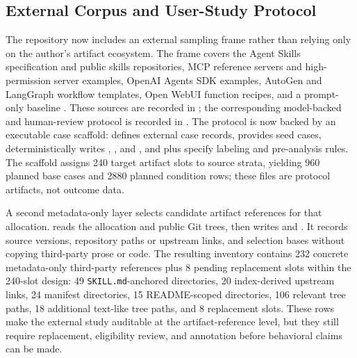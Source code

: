 \documentclass[11pt]{article}
\begin{document}
\subsection{External Corpus and User-Study Protocol}

The repository now includes an external sampling frame rather than relying
only on the author's artifact ecosystem. The frame covers the Agent Skills
specification and public skills repositories, MCP reference servers and
high-permission server examples, OpenAI Agents SDK examples, AutoGen and
LangGraph workflow templates, Open WebUI function recipes, and a prompt-only
baseline \citep{agentskills2026spec,anthropic2026skills,modelcontextprotocol2026servers,openai2026agentspython,openai2026agentsjs,wu2024autogen}.
These sources are recorded in
; the corresponding
model-backed and human-review protocol is recorded in
.
The protocol is now backed by an executable case scaffold:
 defines external case
records,  provides seed cases,
 deterministically writes
,
, and
, and
 plus
 specify labeling and pre-analysis
rules. The scaffold assigns 240 target artifact slots to source strata,
yielding 960 planned base cases and 2880 planned condition rows; these files
are protocol artifacts, not outcome data.

A second metadata-only layer selects candidate artifact references for that
allocation.  reads the allocation
and public Git trees, then writes
 and
. It records source
versions, repository paths or upstream links, and selection bases without
copying third-party prose or code. The resulting inventory contains 232
concrete metadata-only third-party references plus 8 pending replacement slots
within the 240-slot design: 49 \texttt{SKILL.md}-anchored directories, 20
index-derived upstream links, 24 manifest directories, 15 README-scoped
directories, 106 relevant tree paths, 18 additional text-like tree paths, and
8 replacement slots. These rows make the external study auditable at the
artifact-reference level, but they still require replacement, eligibility
review, and annotation before behavioral claims can be made.
\end{document}
